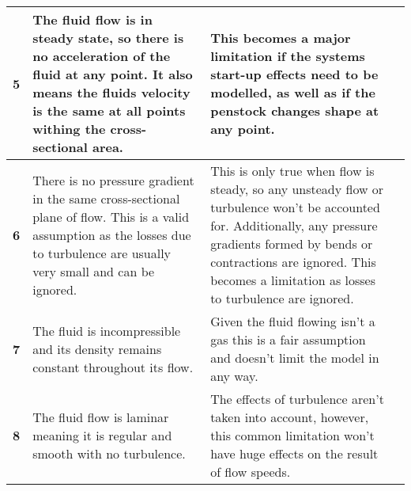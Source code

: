 \begin{table}[tbh!]
{\begin{tabular}{|p{0.5cm}|p{8cm}|p{10cm}|p{0.6cm}|}
\textbf{5}   & The fluid flow is in steady state, so there is no acceleration of the fluid at any point. It also means the fluids velocity is the same at all points withing the cross-sectional area.                                              & This becomes a major limitation if the systems start-up effects need to be modelled, as well as if the penstock changes shape at any point.                                       &           \cite{improvedmomentummodel}    \\ \hline
\textbf{6}   & There is no pressure gradient in the same cross-sectional plane of flow. This is a valid assumption as the losses due to turbulence are usually very small and can be ignored.                                                                                                                                                            & This is only true when flow is steady, so any unsteady flow or turbulence won't be accounted for. Additionally, any pressure gradients formed by bends or contractions are ignored. This becomes a limitation as losses to turbulence are ignored. &  \cite{mainmodelpaper}     \\ \hline
\textbf{7}   & The fluid is incompressible and its density remains constant throughout its flow.                                                                                                                                                    & Given the fluid flowing isn't a gas this is a fair assumption and doesn't limit the model in any way.                                                                               & \cite{fluidmechanicstextbook}     \\ \hline
\textbf{8}   & The fluid flow is laminar meaning it is regular and smooth with no turbulence.                                                                                                                                                       & The effects of turbulence aren't taken into account, however, this common limitation won't have huge effects on the result of flow speeds.                                          & \cite{improvedmomentummodel}    \\ \hline
\end{tabular}%
}
\end{table}